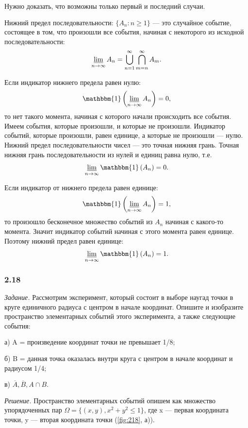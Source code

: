 \documentclass{book}
\begin{document}
Нужно доказать, что возможны только первый и последний случаи.

Нижний предел последовательности:
$\{ A_n : n \geq 1 \}$ --- это случайное событие, состоящее в том, что произошли все события, начиная с некоторого из исходной последовательности:
$$\varliminf \limits_{n\to\infty} A_n = \bigcup \limits_{n=1}^\infty \bigcap \limits_{m=n}^\infty A_m. $$

Если индикатор нижнего предела равен нулю:
$$ \mathbbm{1} \left( \varliminf \limits_{n\to\infty} A_n \right) = 0 , $$
то нет такого момента, начиная с которого начали происходить все события.
Имеем события, которые произошли, и которые не произошли.
Индикатор событий, которые произошли, равен единице, а которые не произошли --- нулю.
Нижний предел последовательности чисел --- это точная нижняя грань.
Точная нижняя грань последовательности из нулей и единиц равна нулю, т.е.
$$\varliminf \limits_{n\to\infty} \mathbbm{1} \left( A_n \right) = 0 . $$

Если индикатор от нижнего предела равен единице:
$$ \mathbbm{1} \left( \varliminf \limits_{n\to\infty} A_n \right) = 1 , $$
то произошло бесконечное множество событий из $A_n$ начиная с какого-то момента.
Значит индикатор событий начиная с этого момента равен единице.
Поэтому нижний предел равен единице:
$$\varliminf \limits_{n\to\infty} \mathbbm{1} \left( A_n \right) = 1 . $$

\subsubsection*{2.18}

\textit{Задание.} Рассмотрим эксперимент, который состоит в выборе наугад точки в круге единичного радиуса с центром в начале координат.
Опишите и изобразите пространство элементарных событий этого эксперимента, а также следующие события:

а) A = {произведение координат точки не превышает 1/8};

б) B = {данная точка оказалась внутри круга с центром в начале координат и радиусом 1/4};

в) $ \overline{ A },
\overline{ B },
A \cap B $.

\textit{Решение.}
Пространство элементарных событий опишем как множество упорядоченных пар
$ \Omega =
\{ (x, y), x^2 + y^2 \leq 1 \} $,
где x --- первая координата точки, y --- вторая координата точки (\ref{fig:218}, а)).
\end{document}
